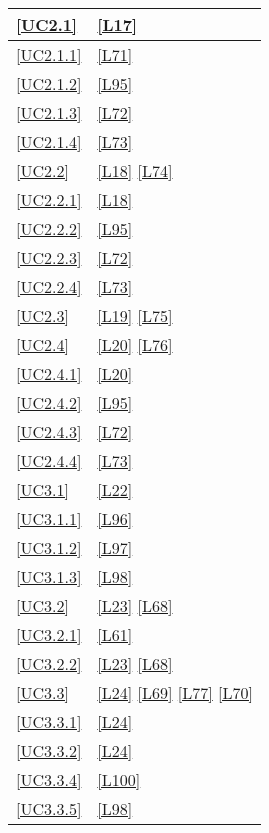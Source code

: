 \begin{longtable}{|P{6cm}|P{6cm}|}
	\hline \ref{UC2.1} & \ref{L17} \\
	\hline \ref{UC2.1.1} & \ref{L71} \\
	\hline \ref{UC2.1.2} & \ref{L95} \\
	\hline \ref{UC2.1.3} & \ref{L72} \\
	\hline \ref{UC2.1.4} & \ref{L73} \\
	\hline \ref{UC2.2} & \ref{L18} \linebreak \ref{L74}\\
	\hline \ref{UC2.2.1} & \ref{L18} \\
	\hline \ref{UC2.2.2} & \ref{L95} \\
	\hline \ref{UC2.2.3} & \ref{L72} \\
	\hline \ref{UC2.2.4} & \ref{L73} \\
	\hline \ref{UC2.3} & \ref{L19} \linebreak \ref{L75} \\
	\hline \ref{UC2.4} & \ref{L20} \linebreak \ref{L76} \\	
	\hline \ref{UC2.4.1} & \ref{L20} \\	
	\hline \ref{UC2.4.2} & \ref{L95} \\	
	\hline \ref{UC2.4.3} & \ref{L72} \\	
	\hline \ref{UC2.4.4} & \ref{L73} \\	
	\hline \ref{UC3.1} & \ref{L22} \\
	\hline \ref{UC3.1.1} & \ref{L96} \\
	\hline \ref{UC3.1.2} & \ref{L97} \\
	\hline \ref{UC3.1.3} & \ref{L98} \\
	\hline \ref{UC3.2} & \ref{L23} \linebreak \ref{L68} \\
	\hline \ref{UC3.2.1} & \ref{L61} \\
	\hline \ref{UC3.2.2} & \ref{L23} \linebreak \ref{L68} \\
	\hline \ref{UC3.3} & \ref{L24} \linebreak \ref{L69} \linebreak \ref{L77} \linebreak \ref{L70} \\
	\hline \ref{UC3.3.1} & \ref{L24} \\
	\hline \ref{UC3.3.2} & \ref{L24} \\
	\hline \ref{UC3.3.4} & \ref{L100} \\
	\hline \ref{UC3.3.5} & \ref{L98} \\

\end{longtable}
